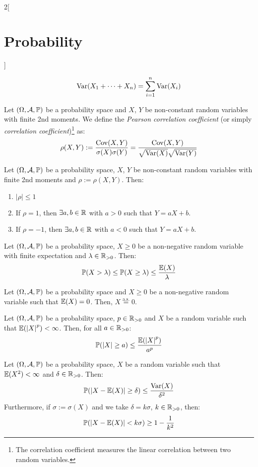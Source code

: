 \documentclass[../../../main_math.tex]{subfiles}
\begin{document}
\begin{multicols}{2}[\section{Probability}]
\begin{corollary}
    $$\mathrm{Var}(X_1+\cdots+X_n)=\sum_{i=1}^n\mathrm{Var}(X_i)$$
  \end{corollary}
  \begin{definition}
    Let $(\Omega,\mathcal{A},\mathbb{P})$ be a probability space and $X$, $Y$ be non-constant random variables with finite 2nd moments. We define the \emph{Pearson correlation coefficient} (or simply \emph{correlation coefficient})\footnote{The correlation coefficient measures the linear correlation between two random variables.} as: $$\rho(X,Y):=\frac{\mathrm{Cov}(X,Y)}{\sigma(X)\sigma(Y)}=\frac{\mathrm{Cov}(X,Y)}{\sqrt{\mathrm{Var}(X)}\sqrt{\mathrm{Var}(Y)}}$$
  \end{definition}
  \begin{proposition}
    Let $(\Omega,\mathcal{A},\mathbb{P})$ be a probability space, $X$, $Y$ be non-constant random variables with finite 2nd moments and $\rho:=\rho(X,Y)$. Then:
    \begin{enumerate}
      \item $|\rho|\leq 1$
      \item If $\rho=1$, then $\exists a,b\in\mathbb{R}$ with $a>0$ such that $Y=aX+b$.
      \item If $\rho=-1$, then $\exists a,b\in\mathbb{R}$ with $a<0$ such that $Y=aX+b$.
    \end{enumerate}
  \end{proposition}
  \begin{theorem}
    Let $(\Omega,\mathcal{A},\mathbb{P})$ be a probability space, $X\geq 0$ be a non-negative random variable with finite expectation and $\lambda\in\mathbb{R}_{>0}$. Then:
    $$\mathbb{P}(X>\lambda)\leq \mathbb{P}(X\geq \lambda)\leq \frac{\mathbb{E}(X)}{\lambda}$$
  \end{theorem}
  \begin{corollary}
    Let $(\Omega,\mathcal{A},\mathbb{P})$ be a probability space and $X\geq 0$ be a non-negative random variable such that $\mathbb{E}(X)=0$. Then, $X\overset{\text{a.s.}}{=}0$.
  \end{corollary}
  \begin{corollary}
    Let $(\Omega,\mathcal{A},\mathbb{P})$ be a probability space, $p\in\mathbb{R}_{>0}$ and $X$ be a random variable such that $\mathbb{E}({|X|}^p)<\infty$. Then, for all $a\in\mathbb{R}_{>0}$: $$\mathbb{P}(|X|\geq a)\leq \frac{\mathbb{E}({|X|}^p)}{a^p}$$
  \end{corollary}
  \begin{corollary}
    Let $(\Omega,\mathcal{A},\mathbb{P})$ be a probability space, $X$ be a random variable such that $\mathbb{E}(X^2)<\infty$ and $\delta\in\mathbb{R}_{>0}$. Then: $$\mathbb{P}(|X-\mathbb{E}(X)|\geq\delta)\leq\frac{\mathrm{Var}(X)}{\delta^2}$$ Furthermore, if $\sigma:=\sigma(X)$ and we take $\delta=k\sigma$, $k\in\mathbb{R}_{>0}$, then: $$\mathbb{P}(|X-\mathbb{E}(X)|<k\sigma)\geq1-\frac{1}{k^2}$$

\end{corollary}
\end{multicols}
\end{document}
